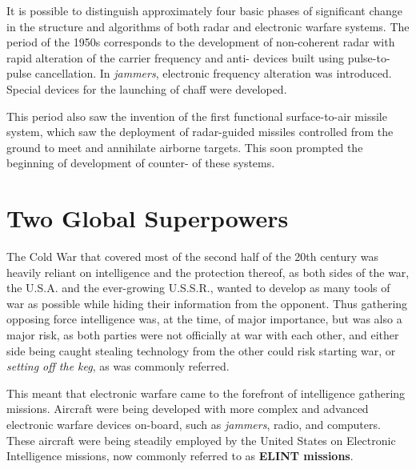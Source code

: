 \documentclass[english,purist]{ist-report}
\begin{document}
It is possible to distinguish approximately four basic phases of significant change in the structure and algorithms of both radar and electronic warfare systems. The period of the 1950s corresponds to the development of non-coherent radar with rapid alteration of the carrier frequency and anti-\jamming{} devices built using pulse-to-pulse cancellation. In \textit{jammers}, electronic frequency alteration was introduced. Special devices for the launching of chaff were developed.

This period also saw the invention of the first functional surface-to-air missile system, which saw the deployment of radar-guided missiles controlled from the ground to meet and annihilate airborne targets. This soon prompted the beginning of development of counter-\jamming{} of these systems.

\section{Two Global Superpowers}

The Cold War that covered most of the second half of the 20th century was heavily reliant on intelligence and the protection thereof, as both sides of the war, the U.S.A. and the ever-growing U.S.S.R., wanted to develop as many tools of war as possible while hiding their information from the opponent. Thus gathering opposing force intelligence was, at the time, of major importance, but was also a major risk, as both parties were not officially at war with each other, and either side being caught stealing technology from the other could risk starting war, or \textit{setting off the keg}, as was commonly referred.

This meant that electronic warfare came to the forefront of intelligence gathering missions. Aircraft were being developed with more complex and advanced electronic warfare devices on-board, such as \textit{jammers}, radio, and computers. These aircraft were being steadily employed by the United States on Electronic Intelligence missions, now commonly referred to as \textbf{ELINT missions}.
\end{document}

